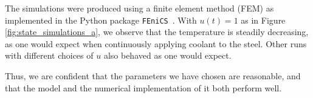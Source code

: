 The simulations were produced using a finite element method (FEM) as implemented in the Python package \verb|FEniCS|~\cite{fenics}. With $u(t) = 1$  as in Figure \ref{fig:state_simulations_a}, we observe that  the temperature is steadily decreasing, as one would expect when continuously applying coolant to the steel. Other runs with different choices of $u$ also behaved as one would expect.

Thus, we are confident that the parameters we have chosen are reasonable, and that the model and the numerical implementation of it both perform well.
\begin{figure}
\end{figure}
